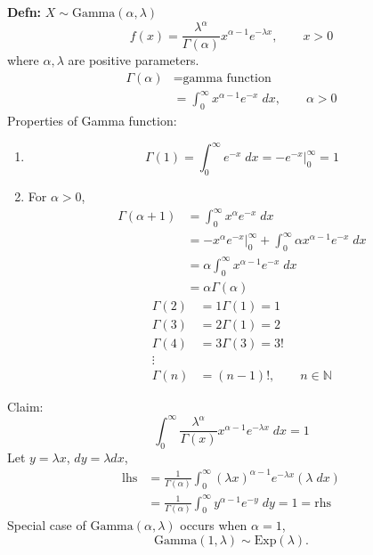 \documentclass[a4paper]{article}
\newcommand{\n}{\hfill\break}
\newcommand{\defn}[1]{\par\noindent\settowidth{\hangindent}{\textbf{Defn: }}\textbf{Defn: }#1\n}
\newcommand{\natures}{\mathbb{N}}
\newcommand{\N}{\natures}
\begin{document}
\defn{$X\sim \text{Gamma}(\alpha, \lambda)$
\[f(x)=\frac{\lambda^\alpha}{\Gamma(\alpha)}x^{\alpha-1}e^{-\lambda x}, \qquad x>0\]
where $\alpha, \lambda$ are positive parameters.
\begin{align*}
    \Gamma(\alpha)&=\text{gamma function} \\
    &=\int^\infty_0 x^{\alpha-1}e^{-x}\;dx, \qquad\alpha>0
\end{align*}
Properties of Gamma function:
\begin{enumerate}
    \item \[\Gamma(1)=\int_0^\infty e^{-x}\;dx=-e^{-x}\bigg\vert^\infty_0=1\]
    \item For $\alpha>0$,
        \begin{align*}
            \Gamma(\alpha+1)&=\int_0^\infty x^\alpha e^{-x}\;dx \\
            &=-x^\alpha e^{-x}\bigg\vert^\infty_0+\int_0^\infty \alpha x^{\alpha-1} e^{-x}\;dx \\
            &=\alpha\int_0^\infty x^{\alpha-1} e^{-x}\;dx \\
            &=\alpha\Gamma(\alpha)
        \end{align*}
        \begin{align*}
            \Gamma(2)&=1\Gamma(1)=1 \\
            \Gamma(3)&=2\Gamma(1)=2 \\
            \Gamma(4)&=3\Gamma(3)=3! \\
            \vdots \\
            \Gamma(n)&=(n-1)!,\qquad n\in\N
        \end{align*}
\end{enumerate}
Claim:
\[\int_0^\infty\frac{\lambda^\alpha}{\Gamma(x)}x^{\alpha-1}e^{-\lambda x}\;dx=1\]
Let $y=\lambda x$, $dy=\lambda dx$,
\begin{align*}
    \text{lhs}&=\frac{1}{\Gamma(\alpha)}\int_0^\infty(\lambda x)^{\alpha-1}e^{-\lambda x}(\lambda\;dx) \\
    &=\frac{1}{\Gamma(\alpha)}\int_0^\infty y^{\alpha-1}e^{-y}\;dy=1=\text{rhs}
\end{align*}
Special case of $\text{Gamma}(\alpha, \lambda)$ occurs when $\alpha=1$,
\[\text{Gamma}(1, \lambda)\sim\text{Exp}(\lambda).\]
}
\end{document}
